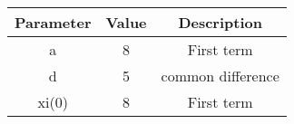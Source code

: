 

    \begin{tabular}{|c|c|c|}
        \hline
        \textbf{Parameter} & \textbf{Value} & \textbf{Description} \\
        \hline
        a     & 8 & First term \\
        d     & 5 & common difference\\
        xi(0) & 8 & First term \\
        \hline
    \end{tabular}
    
    


